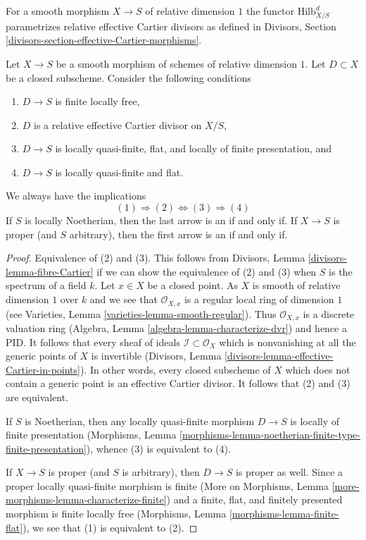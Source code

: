 \noindent
For a smooth morphism $X \to S$ of relative dimension $1$ the functor
$\text{Hilb}^d_{X/S}$ parametrizes relative effective Cartier divisors
as defined in
Divisors, Section \ref{divisors-section-effective-Cartier-morphisms}.

\begin{lemma}
\label{lemma-divisors-on-curves}
Let $X \to S$ be a smooth morphism of schemes of relative dimension $1$.
Let $D \subset X$ be a closed subscheme. Consider the following conditions
\begin{enumerate}
\item $D \to S$ is finite locally free,
\item $D$ is a relative effective Cartier divisor on $X/S$,
\item $D \to S$ is locally quasi-finite, flat, and
locally of finite presentation, and
\item $D \to S$ is locally quasi-finite and flat.
\end{enumerate}
We always have the implications
$$
(1) \Rightarrow (2) \Leftrightarrow (3) \Rightarrow (4)
$$
If $S$ is locally Noetherian, then the last arrow is an if and only if.
If $X \to S$ is proper (and $S$ arbitrary), then the first arrow is
an if and only if.
\end{lemma}

\begin{proof}
Equivalence of (2) and (3). This follows from
Divisors, Lemma \ref{divisors-lemma-fibre-Cartier}
if we can show the equivalence of (2) and (3) when
$S$ is the spectrum of a field $k$. Let $x \in X$ be a closed point.
As $X$ is smooth of relative dimension $1$ over $k$ and we see that
$\mathcal{O}_{X, x}$ is a regular local ring of dimension $1$
(see Varieties, Lemma \ref{varieties-lemma-smooth-regular}).
Thus $\mathcal{O}_{X, x}$ is a discrete valuation ring
(Algebra, Lemma \ref{algebra-lemma-characterize-dvr})
and hence a PID. It follows that every sheaf of ideals
$\mathcal{I} \subset \mathcal{O}_X$ which is nonvanishing at all
the generic points of $X$ is invertible
(Divisors, Lemma \ref{divisors-lemma-effective-Cartier-in-points}).
In other words, every closed subscheme of $X$ which does not contain
a generic point is an effective Cartier divisor.
It follows that (2) and (3) are equivalent.

\medskip\noindent
If $S$ is Noetherian, then any locally quasi-finite morphism
$D \to S$ is locally of finite presentation (Morphisms, Lemma
\ref{morphisms-lemma-noetherian-finite-type-finite-presentation}),
whence (3) is equivalent to (4).

\medskip\noindent
If $X \to S$ is proper (and $S$ is arbitrary), then $D \to S$ is
proper as well. Since a proper locally quasi-finite morphism is finite
(More on Morphisms, Lemma \ref{more-morphisms-lemma-characterize-finite})
and a finite, flat, and finitely presented morphism is finite locally free
(Morphisms, Lemma \ref{morphisms-lemma-finite-flat}), we see that
(1) is equivalent to (2).
\end{proof}

